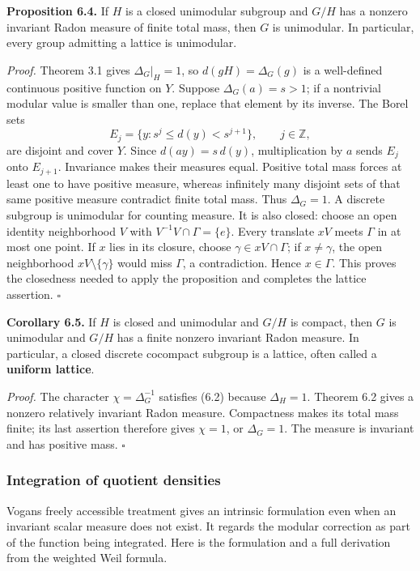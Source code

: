 \documentclass[
  english,
  11pt,
  a4paper,
]{article}
\begin{document}
\textbf{Proposition 6.4.} If \(H\) is a closed unimodular subgroup and
\(G/H\) has a nonzero invariant Radon measure of finite total mass, then
\(G\) is unimodular. In particular, every group admitting a lattice is
unimodular.

\emph{Proof.} Theorem 3.1 gives \(\Delta_G|_H=1\), so
\(d(gH)=\Delta_G(g)\) is a well-defined continuous positive function on
\(Y\). Suppose \(\Delta_G(a)=s>1\); if a nontrivial modular value is
smaller than one, replace that element by its inverse. The Borel sets
\[E_j=\{y:s^j\leq d(y)<s^{j+1}\},\qquad j\in\mathbb Z,\] are disjoint
and cover \(Y\). Since \(d(ay)=s\,d(y)\), multiplication by \(a\) sends
\(E_j\) onto \(E_{j+1}\). Invariance makes their measures equal.
Positive total mass forces at least one to have positive measure,
whereas infinitely many disjoint sets of that same positive measure
contradict finite total mass. Thus \(\Delta_G=1\). A discrete subgroup
is unimodular for counting measure. It is also closed: choose an open
identity neighborhood \(V\) with \(V^{-1}V\cap\Gamma=\{e\}\). Every
translate \(xV\) meets \(\Gamma\) in at most one point. If \(x\) lies in
its closure, choose \(\gamma\in xV\cap\Gamma\); if \(x\ne\gamma\), the
open neighborhood \(xV\setminus\{\gamma\}\) would miss \(\Gamma\), a
contradiction. Hence \(x\in\Gamma\). This proves the closedness needed
to apply the proposition and completes the lattice assertion.
\(\square\)

\textbf{Corollary 6.5.} If \(H\) is closed and unimodular and \(G/H\) is
compact, then \(G\) is unimodular and \(G/H\) has a finite nonzero
invariant Radon measure. In particular, a closed discrete cocompact
subgroup is a lattice, often called a \textbf{uniform lattice}.

\emph{Proof.} The character \(\chi=\Delta_G^{-1}\) satisfies (6.2)
because \(\Delta_H=1\). Theorem 6.2 gives a nonzero relatively invariant
Radon measure. Compactness makes its total mass finite; its last
assertion therefore gives \(\chi=1\), or \(\Delta_G=1\). The measure is
invariant and has positive mass. \(\square\)

\subsubsection{Integration of quotient
densities}\label{quotient-measures-and-weils-integration-formula--quotient-density-integral}

Vogan\textquotesingle s freely accessible treatment gives an intrinsic
formulation even when an invariant scalar measure does not exist. It
regards the modular correction as part of the function being integrated.
Here is the formulation and a full derivation from the weighted Weil
formula.
\end{document}
